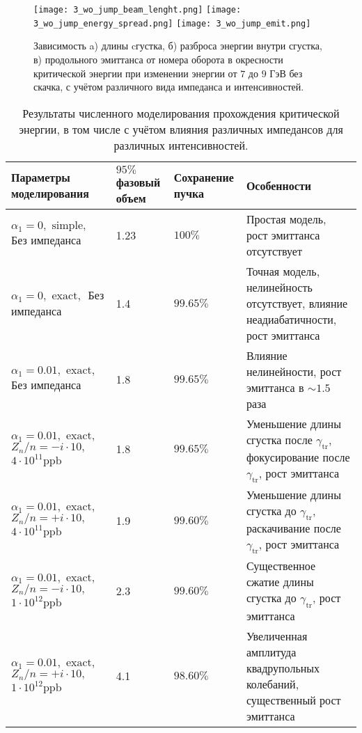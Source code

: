 \begin{figure} [h!]
   \texttt{[image: 3\_wo\_jump\_beam\_lenght.png]}
   \texttt{[image: 3\_wo\_jump\_energy\_spread.png]}
   \texttt{[image: 3\_wo\_jump\_emit.png]}
   \caption{Зависимость a) длины cгустка, б) разброса энергии внутри сгустка, в) продольного эмиттанса от номера оборота в окресности критической энергии при изменении энергии от $7$ до $9$ ГэВ без скачка, с учётом различного вида импеданса и интенсивностей.}
   \label{fig:3_wo_jump}
\end{figure}

\begin{table}
\begin{center}
\begin{tabular}{| m{4cm} | M{2.5cm} | M{2.5cm} | m{6.6cm} |}
\hline 
Параметры моделирования & $95 \%$ фазовый объем & Сохранение пучка & Особенности \\
\hline
$\alpha_1=0, \text { simple, }$ Без импеданса & 1.23 & $100\%$ & Простая модель, рост эмиттанса отсутствует \\
\hline 
$\alpha_1=0, \text { exact, }$ Без импеданса & 1.4 & $99.65\%$ & Точная модель, нелинейность отсутствует, влияние неадиабатичности, рост эмиттанса \\
\hline 
$\alpha_1=0.01, \text { exact, }$ Без импеданса & 1.8 & $99.65\%$ & Влияние нелинейности, рост эмиттанса в $\sim 1.5$ раза \\
\hline 
$
 \alpha_1=0.01, \text { exact, }$
$ Z_n / n=-i \cdot 10, \quad$
$4 \cdot 10^{11} \mathrm{ppb} $
 & 1.8 & $99.65\%$ & Уменьшение длины сгустка после $\gamma_{\mathrm{tr}}$, фокусирование после $\gamma_{\mathrm{tr}}$, рост эмиттанса \\
\hline 
$
\alpha_1=0.01, \text { exact, }$ 
$ Z_n / n=+i \cdot 10, \quad$
$4 \cdot 10^{11} \mathrm{ppb} $
 & 1.9 & $99.60\%$ & Уменьшение длины сгустка до $\gamma_{\mathrm{tr}}$, раскачивание после $\gamma_{\mathrm{tr}}$, рост эмиттанса \\
\hline 
$
\alpha_1=0.01, \text { exact, } $ 
$Z_n / n=-i \cdot 10, \quad$
$1 \cdot 10^{12} \mathrm{ppb}$
 & 2.3 & $99.60\%$ & Существенное сжатие длины сгустка до $\gamma_{\mathrm{tr}}$, рост эмиттанса \\
\hline 
$
 \alpha_1=0.01, \text { exact, } $ 
$ Z_n / n=+i \cdot 10, \quad$
$ 1 \cdot 10^{12} \mathrm{ppb}$
 & 4.1 & $98.60\%$ & Увеличенная амплитуда квадрупольных колебаний, существенный рост эмиттанса \\
\hline
\end{tabular}
\end{center}
\caption{Результаты численного моделирования прохождения критической энергии, в том числе с учётом влияния различных импедансов для различных интенсивностей.}
\label{tbl:u-70_crossing}
\end{table}


